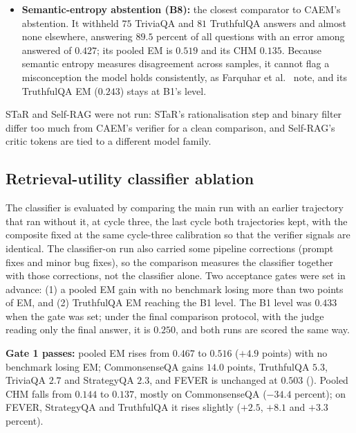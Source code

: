 \begin{itemize}
    \item \textbf{Semantic-entropy abstention (B8):}\label{sec:comp-semantic-entropy} the closest comparator to CAEM's abstention. It withheld $75$ TriviaQA and $81$ TruthfulQA answers and almost none elsewhere, answering $89.5$ percent of all questions with an error among answered of $0.427$; its pooled EM is $0.519$ and its CHM $0.135$. Because semantic entropy measures disagreement across samples, it cannot flag a misconception the model holds consistently, as Farquhar et al.~\cite{farquhar2024semantic} note, and its TruthfulQA EM ($0.243$) stays at B1's level.
\end{itemize}
STaR and Self-RAG were not run: STaR's rationalisation step and binary filter differ too much from CAEM's verifier for a clean comparison, and Self-RAG's critic tokens are tied to a different model family.

\subsection{Retrieval-utility classifier ablation}
\label{sec:comp-ablations}
\label{sec:ruc-ablation}

The classifier is evaluated by comparing the main run with an earlier trajectory that ran without it, at cycle three, the last cycle both trajectories kept, with the composite fixed at the same cycle-three calibration so that the verifier signals are identical. The classifier-on run also carried some pipeline corrections (prompt fixes and minor bug fixes), so the comparison measures the classifier together with those corrections, not the classifier alone. Two acceptance gates were set in advance: (1) a pooled EM gain with no benchmark losing more than two points of EM, and (2) TruthfulQA EM reaching the B1 level. The B1 level was $0.433$ when the gate was set; under the final comparison protocol, with the judge reading only the final answer, it is $0.250$, and both runs are scored the same way.



\textbf{Gate 1 passes:} pooled EM rises from $0.467$ to $0.516$ ($+4.9$ points) with no benchmark losing EM; CommonsenseQA gains $14.0$ points, TruthfulQA $5.3$, TriviaQA $2.7$ and StrategyQA $2.3$, and FEVER is unchanged at $0.503$ (). Pooled CHM falls from $0.144$ to $0.137$, mostly on CommonsenseQA ($-34.4$ percent); on FEVER, StrategyQA and TruthfulQA it rises slightly ($+2.5$, $+8.1$ and $+3.3$ percent).


